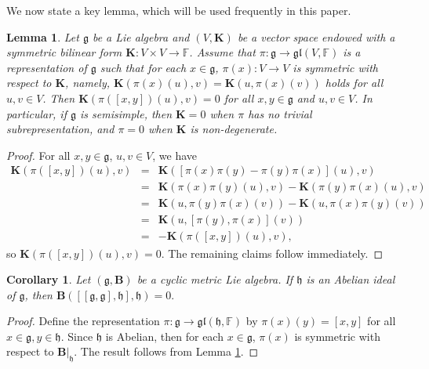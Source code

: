 \documentclass[reqno]{amsart}
\newtheorem{lem}[thm]{Lemma}
\newtheorem{cor}[thm]{Corollary}
\theoremstyle{definition}
\begin{document}
We now state a key lemma, which will be used frequently in this paper.
\begin{lem}\label{2-prop-semisimple}
Let $\mathfrak{g}$ be a  Lie algebra
and $(V,\mathbf{K})$ be a vector space  endowed with a symmetric bilinear
 form $\mathbf{K}:V\times V\rightarrow \mathbb{F}$.
Assume that $\pi:\mathfrak{g}\rightarrow \mathfrak{gl}(V,\mathbb{F})$ is a representation of $\mathfrak{g}$ such that for each $x\in\mathfrak{g}$, $\pi(x):V\rightarrow V$ is symmetric with respect to $\mathbf{K}$,
 namely, $\mathbf{K}(\pi(x)(u),v)=\mathbf{K}(u,\pi(x)(v))$ holds for all $u,v\in V$.
 Then $\mathbf{K}(\pi([x,y])(u),v)=0$ for all $x,y\in \mathfrak{g}$ and $u,v\in V$.
 In particular, if $\mathfrak{g}$ is semisimple, then $\mathbf{K}=0$ when $\pi$ has no trivial subrepresentation,
 and  $\pi=0$ when $\mathbf{K}$ is non-degenerate.
\end{lem}
\begin{proof}
For all $x,y\in\mathfrak{g}$, $u,v\in V$, we have
\begin{eqnarray*}
\mathbf{K}(\pi([x,y])(u),v)&=&\mathbf{K}([\pi(x)\pi(y)-\pi(y)\pi(x)](u),v)\\
          &=&\mathbf{K}(\pi(x)\pi(y)(u),v)-\mathbf{K}(\pi(y)\pi(x)(u),v)\\
          &=& \mathbf{K}(u,\pi(y)\pi(x)(v))-\mathbf{K}(u,\pi(x)\pi(y)(v))\\
          &=&\mathbf{K}(u,[\pi(y),\pi(x)](v))\\
          &=&-\mathbf{K}(\pi([x,y])(u),v),
\end{eqnarray*}
so $\mathbf{K}(\pi([x,y])(u),v)=0$. The remaining claims follow immediately.
\end{proof}
\begin{cor}\label{2-cor-abelian}
Let $(\mathfrak{g},\mathbf{B})$ be a cyclic metric Lie algebra.
If $\mathfrak{h}$ is an Abelian ideal of $\mathfrak{g}$, then
$\mathbf{B}([[\mathfrak{g},\mathfrak{g}],\mathfrak{h}],\mathfrak{h})=0.$
\end{cor}
\begin{proof}
Define the representation  $\pi:\mathfrak{g}\rightarrow \mathfrak{gl}(\mathfrak{h},\mathbb{F})$
 by $\pi(x)(y)=[x,y]$ for all $x\in \mathfrak{g}, y\in \mathfrak{h}$.
Since $\mathfrak{h}$ is Abelian, then for each $x\in \mathfrak{g}$, $\pi(x)$ is symmetric with respect to
$\mathbf{B}|_{\mathfrak{h}}$. The result follows from Lemma \ref{2-prop-semisimple}.
\end{proof}
\end{document}
